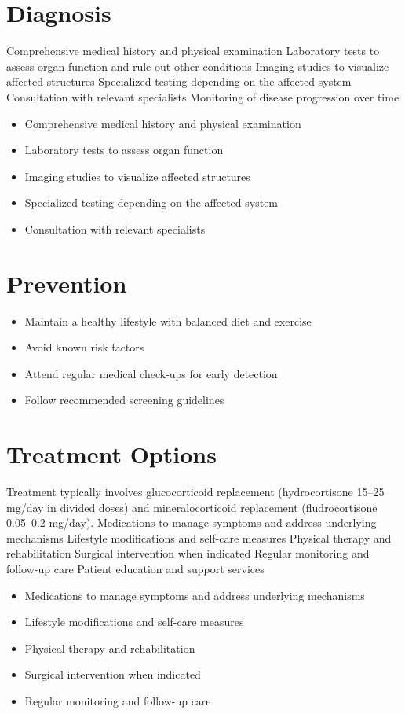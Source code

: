 \section{Diagnosis}
Comprehensive medical history and physical examination Laboratory tests to assess organ function and rule out other conditions Imaging studies to visualize affected structures Specialized testing depending on the affected system Consultation with relevant specialists Monitoring of disease progression over time

\begin{itemize}[noitemsep]
  \item Comprehensive medical history and physical examination
  \item Laboratory tests to assess organ function
  \item Imaging studies to visualize affected structures
  \item Specialized testing depending on the affected system
  \item Consultation with relevant specialists
\end{itemize}
\section{Prevention}
\begin{itemize}[noitemsep]
  \item Maintain a healthy lifestyle with balanced diet and exercise
  \item Avoid known risk factors
  \item Attend regular medical check-ups for early detection
  \item Follow recommended screening guidelines
\end{itemize}
\section{Treatment Options}
Treatment typically involves glucocorticoid replacement (hydrocortisone 15--25 mg/day in divided doses) and mineralocorticoid replacement (fludrocortisone 0.05--0.2 mg/day). Medications to manage symptoms and address underlying mechanisms Lifestyle modifications and self-care measures Physical therapy and rehabilitation Surgical intervention when indicated Regular monitoring and follow-up care Patient education and support services

\begin{itemize}[noitemsep]
  \item Medications to manage symptoms and address underlying mechanisms
  \item Lifestyle modifications and self-care measures
  \item Physical therapy and rehabilitation
  \item Surgical intervention when indicated
  \item Regular monitoring and follow-up care
\end{itemize}
